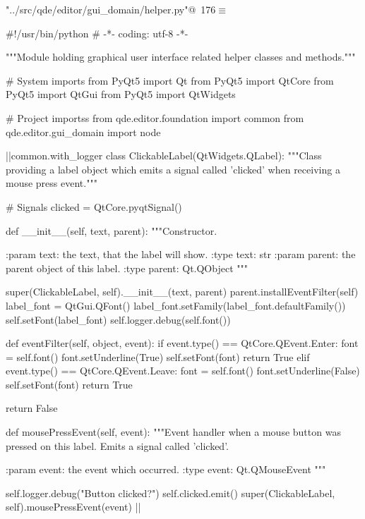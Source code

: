 \documentclass[%
    a4paper,    %
    justified,  %
    nobib,      %
    openany     %
]{tufte-book}
\begin{document}
\begin{flushleft} \small
\begin{minipage}{\linewidth}\label{scrap203}\raggedright\small
{} \verb@"../src/qde/editor/gui_domain/helper.py"@\nobreak\ {\footnotesize {176}}$\equiv$
\vspace{-1ex}
\begin{pythoncode}
#!/usr/bin/python
# -*- coding: utf-8 -*-

"""Module holding graphical user interface related helper classes and
methods."""

# System imports
from PyQt5 import Qt
from PyQt5 import QtCore
from PyQt5 import QtGui
from PyQt5 import QtWidgets

# Project importss
from qde.editor.foundation import common
from qde.editor.gui_domain import node


|\normalfont{}\fontfamily{}|common.with_logger
class ClickableLabel(QtWidgets.QLabel):
    """Class providing a label object which emits a signal called 'clicked'
    when receiving a mouse press event."""

    # Signals
    clicked = QtCore.pyqtSignal()

    def __init__(self, text, parent):
        """Constructor.

        :param text: the text, that the label will show.
        :type text: str
        :param parent: the parent object of this label.
        :type parent: Qt.QObject
        """

        super(ClickableLabel, self).__init__(text, parent)
        parent.installEventFilter(self)
        label_font = QtGui.QFont()
        label_font.setFamily(label_font.defaultFamily())
        self.setFont(label_font)
        self.logger.debug(self.font())

    def eventFilter(self, object, event):
        if event.type() == QtCore.QEvent.Enter:
            font = self.font()
            font.setUnderline(True)
            self.setFont(font)
            return True
        elif event.type() == QtCore.QEvent.Leave:
            font = self.font()
            font.setUnderline(False)
            self.setFont(font)
            return True

        return False

    def mousePressEvent(self, event):
        """Event handler when a mouse button was pressed on this label. Emits a
        signal called 'clicked'.

        :param event: the event which occurred.
        :type event: Qt.QMouseEvent
        """

        self.logger.debug("Button clicked?")
        self.clicked.emit()
        super(ClickableLabel, self).mousePressEvent(event)
|\NWsep|
\end{pythoncode}
\vspace{1.5ex}
\footnotesize
\begin{list}{}{\setlength{\itemsep}{-\parsep}\setlength{\itemindent}{-\leftmargin}}

\item{}
\end{list}
\end{minipage}\vspace{4ex}
\end{flushleft}
\end{document}
